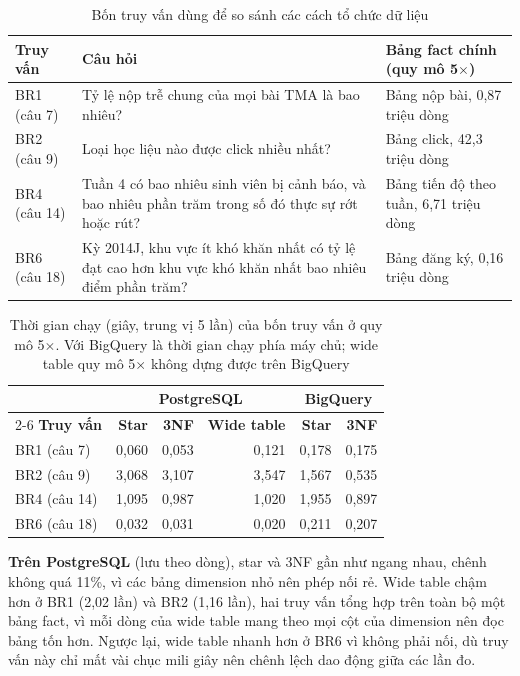 \begin{table}[htbp]
\centering
\small
\begin{tabularx}{\textwidth}{|p{2.2cm}|X|p{4.4cm}|}
\hline
\textbf{Truy vấn} & \textbf{Câu hỏi} & \textbf{Bảng fact chính (quy mô 5$\times$)} \\ \hline
BR1 (câu 7) & Tỷ lệ nộp trễ chung của mọi bài TMA là bao nhiêu? & Bảng nộp bài, 0,87 triệu dòng \\ \hline
BR2 (câu 9) & Loại học liệu nào được click nhiều nhất? & Bảng click, 42,3 triệu dòng \\ \hline
BR4 (câu 14) & Tuần 4 có bao nhiêu sinh viên bị cảnh báo, và bao nhiêu phần trăm trong số đó thực sự rớt hoặc rút? & Bảng tiến độ theo tuần, 6,71 triệu dòng \\ \hline
BR6 (câu 18) & Kỳ 2014J, khu vực ít khó khăn nhất có tỷ lệ đạt cao hơn khu vực khó khăn nhất bao nhiêu điểm phần trăm? & Bảng đăng ký, 0,16 triệu dòng \\ \hline
\end{tabularx}
\caption{Bốn truy vấn dùng để so sánh các cách tổ chức dữ liệu}
\label{tab:bench-truy-van}
\end{table}

\newpage

\begin{table}[htbp]
\centering
\small
\begin{tabular}{|l|r|r|r|r|r|}
\hline
& \multicolumn{3}{c|}{\textbf{PostgreSQL}} & \multicolumn{2}{c|}{\textbf{BigQuery}} \\ \cline{2-6}
\textbf{Truy vấn} & \textbf{Star} & \textbf{3NF} & \textbf{Wide table} & \textbf{Star} & \textbf{3NF} \\ \hline
BR1 (câu 7)  & 0,060 & 0,053 & 0,121 & 0,178 & 0,175 \\ \hline
BR2 (câu 9)  & 3,068 & 3,107 & 3,547 & 1,567 & 0,535 \\ \hline
BR4 (câu 14) & 1,095 & 0,987 & 1,020 & 1,955 & 0,897 \\ \hline
BR6 (câu 18) & 0,032 & 0,031 & 0,020 & 0,211 & 0,207 \\ \hline
\end{tabular}
\caption{Thời gian chạy (giây, trung vị 5 lần) của bốn truy vấn ở quy mô 5$\times$. Với BigQuery là
thời gian chạy phía máy chủ; wide table quy mô 5$\times$ không dựng được trên BigQuery}
\label{tab:benchmark}
\end{table}

\textbf{Trên PostgreSQL} (lưu theo dòng), star và 3NF gần như ngang nhau, chênh không quá 11\%, vì
các bảng dimension nhỏ nên phép nối rẻ. Wide table chậm hơn ở BR1 (2,02 lần) và BR2 (1,16 lần),
hai truy vấn tổng hợp trên toàn bộ một bảng fact, vì mỗi dòng của wide table mang theo mọi cột của
dimension nên đọc bảng tốn hơn. Ngược lại, wide table nhanh hơn ở BR6 vì không phải nối, dù truy vấn
này chỉ mất vài chục mili giây nên chênh lệch dao động giữa các lần đo.

